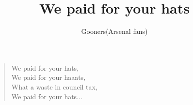 \documentclass[a4paper,12pt]{article}
\title{We paid for your hats}
\author{Gooners(Arsenal fans)}
\date{}
\begin{document}
	
	\maketitle
	
	\begin{verse}
		
		We paid for your hats, \\
		We paid for your haaats, \\
		What a waste in council tax, \\
		We paid for your hats$\ldots$
		
	\end{verse}
	
\end{document}

